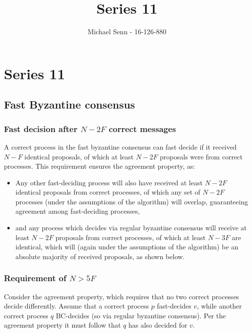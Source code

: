 \documentclass[a4paper]{scrreprt}
\title{Series 11}
\author{Michael Senn \maillink{michael.senn@students.unibe.ch} - 16-126-880}
\date{\printdate}
\begin{document}
\maketitle


\setcounter{chapter}{10}

\chapter{Series 11}

\section{Fast Byzantine consensus}

\subsection{Fast decision after $N - 2F$ correct messages}

A correct process in the fast byzantine consensus can fast decide if it
received $N - F$ identical proposals, of which at least $N - 2F$ proposals were
from correct processes. This requirement ensures the agreement property, as:
\begin{itemize}
	\item Any other fast-deciding process will also have received at least
		$N - 2F$ identical proposals from correct processes, of which
		any set of $N - 2F$ processes (under the assumptions of the
		algorithm) will overlap, guaranteeing agreement among
		fast-deciding processes,
	\item and any process which decides via regular byzantine consensus
		will receive at least $N - 2F$ proposals from correct
		processes, of which at least $N - 3F$ are identical, which will
		(again under the assumptions of the algorithm) be an absolute
		majority of received proposals, as shown below.
\end{itemize}

\subsection{Requirement of $N > 5F$}

Consider the agreement property, which requires that no two correct processes
decide differently. Assume that a correct process $p$ fast-decides $v$, while
another correct process $q$ BC-decides (so via regular byzantine consensus).
Per the agreement property it must follow that $q$ has also decided for $v$.
\end{document}
